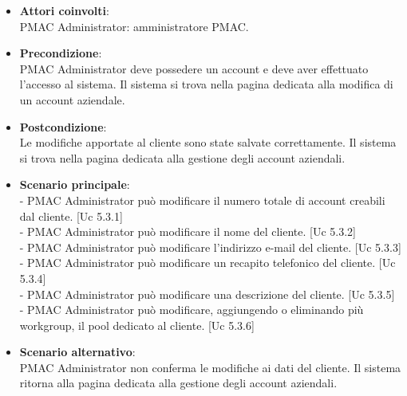 \documentclass[10pt,a4paper]{article}
\begin{document}
\begin{itemize}
\item \textbf{Attori coinvolti}:\\
PMAC Administrator: amministratore PMAC.

\item \textbf{Precondizione}:\\
PMAC Administrator deve possedere un account e deve aver effettuato l'accesso al sistema. Il sistema si trova nella pagina dedicata alla modifica di un account aziendale.

\item \textbf{Postcondizione}:\\
Le modifiche apportate al cliente sono state salvate correttamente. Il sistema si trova nella pagina dedicata alla gestione degli account aziendali.

\item \textbf{Scenario principale}:\\
- PMAC Administrator può modificare il numero totale di account creabili dal cliente. [Uc 5.3.1]\\
- PMAC Administrator può modificare il nome del cliente. [Uc 5.3.2]\\
- PMAC Administrator può modificare l'indirizzo e-mail del cliente. [Uc 5.3.3]\\
- PMAC Administrator può modificare un recapito telefonico del cliente. [Uc 5.3.4]\\
- PMAC Administrator può modificare una descrizione del cliente. [Uc 5.3.5]\\
- PMAC Administrator può modificare, aggiungendo o eliminando più workgroup, il pool dedicato al cliente. [Uc 5.3.6]

\item \textbf{Scenario alternativo}:\\
PMAC Administrator non conferma le modifiche ai dati del cliente. Il sistema ritorna alla pagina dedicata alla gestione degli account aziendali.

\end{itemize}
\end{document}
